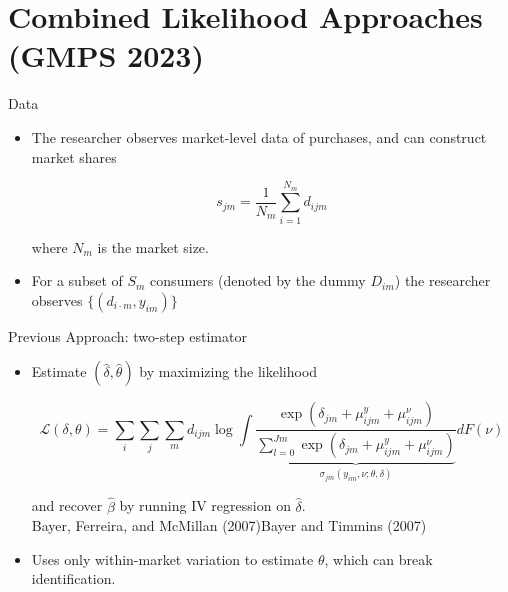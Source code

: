 \documentclass[aspectratio=169,10pt]{beamer}
\begin{document}
\section*{Combined Likelihood Approaches (GMPS 2023)}


\begin{frame}{Data}
    \begin{itemize}
        \item The researcher observes market-level data of purchases, and can construct market shares
    
            \begin{equation}
                s_{jm} = \frac{1}{N_m}\sum_{i=1}^{N_m}d_{ijm}
            \end{equation}
            
            where $N_m$ is the market size.
            
        \item For a subset of $S_m$ consumers (denoted by the dummy $D_{im}$) the researcher observes $\{(d_{i\cdot m},y_{im})\}$
    \end{itemize}
\end{frame}



\begin{frame}{Previous Approach: two-step estimator}

    \begin{itemize}
    
        \item Estimate $(\hat{\delta}, \hat{\theta})$ by maximizing the likelihood
        
        $$\mathcal{L}(\delta,\theta) =  \sum_i\sum_j\sum_m d_{ijm} \log \int \frac{\exp{(\delta_{jm} + \mu_{ijm}^{y} + \mu_{ijm}^{\nu})}}{\underbrace{\sum_{l=0}^{Jm}\exp{(\delta_{jm} + \mu_{ijm}^{y} + \mu_{ijm}^{\nu})}}_{\sigma_{jm}(y_{im},\nu;\theta,\delta)}} dF(\nu)$$
        
        and recover $\hat{\beta}$ by running IV regression on $\hat{\delta}$.\\
        
        {\tiny Bayer, Ferreira, and McMillan (2007)\quad Bayer and Timmins (2007)}
        \item Uses only within-market variation to estimate $\theta$, which can break identification.
    
    \end{itemize}
\end{frame}
\end{document}
